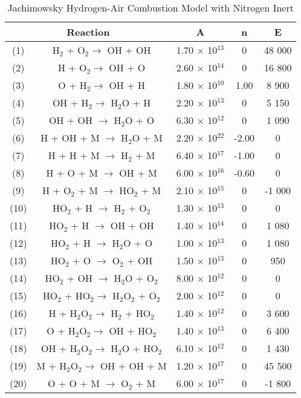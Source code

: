 \begin{table}
\begin{threeparttable}
\caption{Jachimowsky Hydrogen-Air Combustion Model with Nitrogen Inert}
\begin{tabular}{|cc|c|c|c|} \hline
\multicolumn{2}{|c|}{Reaction} & A & n & E  \\ \hline \hline
(1) & H$_{2}$ + O$_{2} \rightarrow$ OH + OH & 1.70 $\times$ 10$^{13}$ & 0 & 48 000 \\
(2) & H + O$_{2} \rightarrow$ OH + O & 2.60 $\times$ 10$^{14}$ & 0 & 16 800 \\
(3) & O + H$_{2} \rightarrow$ OH + H & 1.80 $\times$ 10$^{10}$ & 1.00 & 8 900 \\
(4) & OH + H$_{2} \rightarrow$ H$_{2}$O + H & 2.20 $\times$ 10$^{13}$ & 0 & 5 150 \\
(5) & OH + OH $\rightarrow$ H$_{2}$O + O & 6.30 $\times$ 10$^{12}$ & 0 & 1 090 \\
(6) & H + OH + M $\rightarrow$ H$_{2}$O + M & 2.20 $\times$ 10$^{22}$ & -2.00 & 0 \\
(7) & H + H + M $\rightarrow$ H$_{2}$ + M & 6.40 $\times$ 10$^{17}$ & -1.00 & 0 \\
(8) & H + O + M $\rightarrow$ OH + M & 6.00 $\times$ 10$^{16}$ & -0.60 & 0 \\
(9) & H + O$_{2}$ + M $\rightarrow$ HO$_{2}$ + M & 2.10 $\times$ 10$^{15}$ & 0 & -1 000 \\
(10) & HO$_{2}$ + H $\rightarrow$ H$_{2}$ + O$_{2}$ & 1.30 $\times$ 10$^{13}$ & 0 & 0 \\
(11) & HO$_{2}$ + H $\rightarrow$ OH + OH & 1.40 $\times$ 10$^{14}$ & 0 & 1 080 \\
(12) & HO$_{2}$ + H $\rightarrow$ H$_{2}$O + O & 1.00 $\times$ 10$^{13}$ & 0 & 1 080 \\
(13) & HO$_{2}$ + O $\rightarrow$ O$_{2}$ + OH & 1.50 $\times$ 10$^{13}$ & 0 &  950 \\
(14) & HO$_{2}$ + OH $\rightarrow$ H$_{2}$O + O$_{2}$ & 8.00 $\times$ 10$^{12}$ & 0 & 0 \\
(15) & HO$_{2}$ + HO$_{2} \rightarrow$ H$_{2}$O$_{2}$ + O$_{2}$ & 2.00 $\times$ 10$^{12}$ & 0 & 0 \\
(16) & H + H$_{2}$O$_{2} \rightarrow$ H$_{2}$ + HO$_{2}$ & 1.40 $\times$ 10$^{12}$ & 0 & 3 600 \\
(17) & O + H$_{2}$O$_{2} \rightarrow$ OH + HO$_{2}$ & 1.40 $\times$ 10$^{13}$ & 0 & 6 400 \\
(18) & OH + H$_{2}$O$_{2} \rightarrow$ H$_{2}$O + HO$_{2}$ & 6.10 $\times$ 10$^{12}$ & 0 & 1 430 \\
(19) & M + H$_{2}$O$_{2} \rightarrow$ OH + OH + M & 1.20 $\times$ 10$^{17}$ & 0 & 45 500 \\
(20) & O + O + M $\rightarrow$ O$_{2}$ + M & 6.00 $\times$ 10$^{17}$ & 0 & -1 800 \\
\hline
\end{tabular}
\label{model}
\end{threeparttable}
\end{table}

